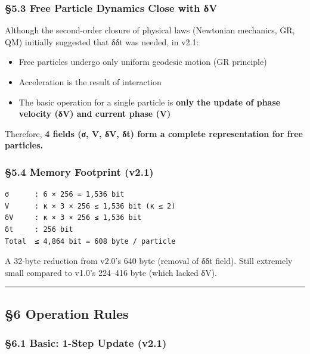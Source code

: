 \documentclass[a4paper,11pt]{article}
\providecommand{\tightlist}{\setlength{\itemsep}{0pt}\setlength{\parskip}{0pt}}
\begin{document}
\subsubsection{§5.3 Free Particle Dynamics Close with
δV}\label{free-particle-dynamics-close-with-ux3b4v}

Although the second-order closure of physical laws (Newtonian mechanics,
GR, QM) initially suggested that δδt was needed, in v2.1:

\begin{itemize}
\tightlist
\item
  Free particles undergo only uniform geodesic motion (GR principle)
\item
  Acceleration is the result of interaction
\item
  The basic operation for a single particle is \textbf{only the update
  of phase velocity (δV) and current phase (V)}
\end{itemize}

Therefore, \textbf{4 fields (σ, V, δV, δt) form a complete
representation for free particles.}

\subsubsection{§5.4 Memory Footprint
(v2.1)}\label{memory-footprint-v2.1}

\begin{verbatim}
σ      : 6 × 256 = 1,536 bit
V      : κ × 3 × 256 ≤ 1,536 bit (κ ≤ 2)
δV     : κ × 3 × 256 ≤ 1,536 bit
δt     : 256 bit
Total  ≤ 4,864 bit = 608 byte / particle
\end{verbatim}

A 32-byte reduction from v2.0's 640 byte (removal of δδt field). Still
extremely small compared to v1.0's 224--416 byte (which lacked δV).

\begin{center}\rule{0.5\linewidth}{0.5pt}\end{center}

\subsection{§6 Operation Rules}\label{operation-rules}

\subsubsection{§6.1 Basic: 1-Step Update
(v2.1)}\label{basic-1-step-update-v2.1}
\end{document}
